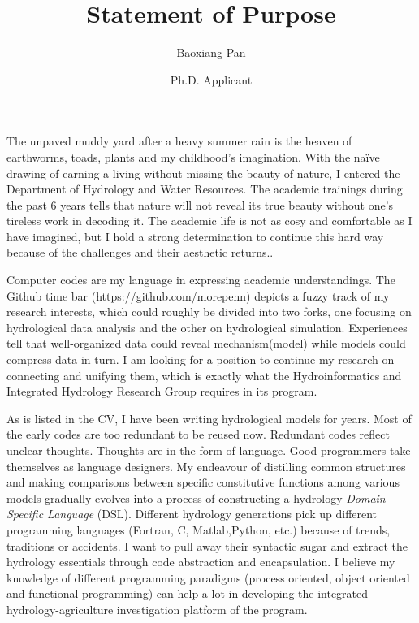 \documentclass{article}
\title{Statement of Purpose}
\author{Baoxiang Pan}
\date{Ph.D. Applicant}
\begin{document}
  \maketitle%
\large{
  The unpaved muddy yard after a heavy summer rain is the heaven of earthworms, toads, plants and my childhood’s imagination. With the naïve drawing of earning a living without missing the beauty of nature, I entered the Department of Hydrology and Water Resources. The academic trainings during the past 6 years tells that nature will not reveal its true beauty without one's tireless work in decoding it.   The academic life is not as cosy and comfortable as I have imagined, but I hold a strong determination to continue this hard way because of the challenges and their aesthetic returns..%

Computer codes are my language in expressing academic understandings. The Github time bar (https://github.com/morepenn) depicts a fuzzy track of my research interests, which could  roughly be divided into two forks, one focusing on hydrological data analysis and the other on hydrological simulation. Experiences tell that well-organized data could reveal mechanism(model)  while  models could compress data in turn. I am looking for a position to continue my research on connecting and unifying them, which is exactly what the Hydroinformatics and Integrated Hydrology Research Group requires in its program.

As is listed in the CV, I have been writing hydrological models for years. Most of the early codes are too redundant to be reused now. Redundant codes reflect unclear thoughts. Thoughts are in the form of language. \iffalse I enjoy clarify my thoughts through distilling common structures and making comparisons between specific constitutive functions among various models. \fi  Good programmers take themselves as language designers. My endeavour of distilling common structures and making comparisons between specific constitutive functions among various models gradually evolves into a process of constructing a hydrology \emph{Domain Specific Language} (DSL). Different hydrology generations  pick up different programming languages (Fortran, C, Matlab,Python, etc.) because of trends, traditions or accidents. \iffalse I enjoy the philosophy in their specific programming paradigms. \fi I want to pull away their syntactic sugar and extract the hydrology essentials through code abstraction and encapsulation. I believe my knowledge of different programming paradigms (process oriented, object oriented and functional programming) can help a lot in developing the integrated hydrology-agriculture investigation platform of the program.

}
\end{document}
